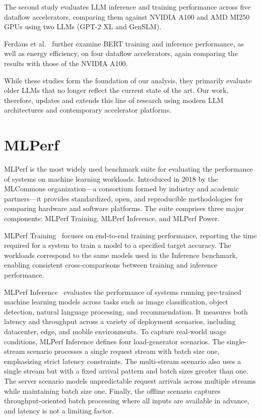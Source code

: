 The second study evaluates LLM inference and training performance across five dataflow accelerators, comparing them against NVIDIA A100 and AMD MI250 GPUs using two LLMs (GPT-2 XL and GenSLM).

Ferdaus et al.~\cite{ferdaus2025evaluating} further examine BERT training and inference performance, as well as energy efficiency, on four dataflow accelerators, again comparing the results with those of the NVIDIA A100.  

While these studies form the foundation of our analysis, they primarily evaluate older LLMs that no longer reflect the current state of the art. Our work, therefore, updates and extends this line of research using modern LLM architectures and contemporary accelerator platforms.

\section{MLPerf}

MLPerf is the most widely used benchmark suite for evaluating the performance of systems on machine learning workloads. Introduced in 2018 by the MLCommons organization—a consortium formed by industry and academic partners—it provides standardized, open, and reproducible methodologies for comparing hardware and software platforms. The suite comprises three major components: MLPerf Training, MLPerf Inference, and MLPerf Power.

MLPerf Training~\cite{mattson2020mlperf} focuses on end-to-end training performance, reporting the time required for a system to train a model to a specified target accuracy. The workloads correspond to the same models used in the Inference benchmark, enabling consistent cross-comparisons between training and inference performance.

MLPerf Inference~\cite{reddi2020mlperf} evaluates the performance of systems running pre-trained machine learning models across tasks such as image classification, object detection, natural language processing, and recommendation. It measures both latency and throughput across a variety of deployment scenarios, including datacenter, edge, and mobile environments. To capture real-world usage conditions, MLPerf Inference defines four load-generator scenarios. The single-stream scenario processes a single request stream with batch size one, emphasizing strict latency constraints. The multi-stream scenario also uses a single stream but with a fixed arrival pattern and batch sizes greater than one. The server scenario models unpredictable request arrivals across multiple streams while maintaining batch size one. Finally, the offline scenario captures throughput-oriented batch processing where all inputs are available in advance, and latency is not a limiting factor.


